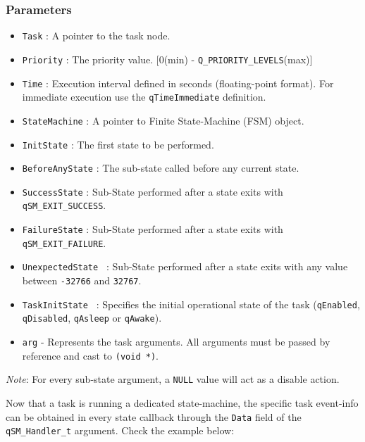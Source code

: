\subsubsection*{Parameters}
\begin{itemize}
    \item \lstinline{Task} : A pointer to the task node. 
    \item \lstinline{Priority} : The priority value. [0(min) - \lstinline{Q_PRIORITY_LEVELS}(max)]
    \item \lstinline{Time} : Execution interval defined in seconds (floating-point format). For immediate execution use the  \lstinline{qTimeImmediate} definition. 
    \item \lstinline{StateMachine} : A pointer to Finite State-Machine (FSM) object.
    \item \lstinline{InitState} :  The first state to be performed. 
    \item \lstinline{BeforeAnyState} :  The sub-state called before any current state.
    \item \lstinline{SuccessState} :  Sub-State performed after a state exits with \lstinline{qSM_EXIT_SUCCESS}.
    \item \lstinline{FailureState} :  Sub-State performed after a state exits with \lstinline{qSM_EXIT_FAILURE}.
    \item \lstinline{UnexpectedState } : Sub-State performed after a state exits with any value between \lstinline{-32766} and \lstinline{32767}.      
    \item \lstinline{TaskInitState } : Specifies the initial operational state of the task (\lstinline{qEnabled}, \lstinline{qDisabled}, \lstinline{qAsleep} or \lstinline{qAwake}).
    \item \lstinline{arg} - Represents the task arguments. All arguments must be passed by reference and cast to \lstinline{(void *)}. 
\end{itemize}

\begin{tcolorbox}
\ArrowBoldDownRight \textit{Note}: For every sub-state argument, a \lstinline{NULL} value will act as a disable action.
\end{tcolorbox}

Now that a task is running a dedicated state-machine, the specific task event-info can be obtained in every state callback through the \lstinline{Data} field of the \lstinline{qSM_Handler_t} argument. Check the example below: \\

